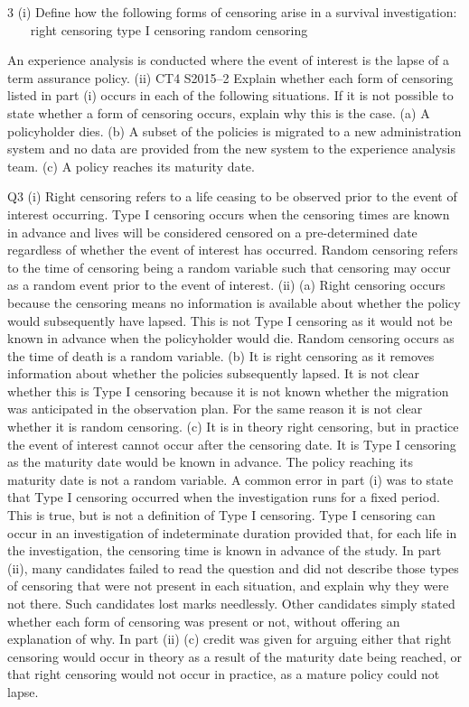 3 (i)
Define how the following forms of censoring arise in a survival investigation:



right censoring
type I censoring
random censoring

An experience analysis is conducted where the event of interest is the lapse of a term
assurance policy.
(ii)
CT4 S2015–2
Explain whether each form of censoring listed in part (i) occurs in each of the
following situations. If it is not possible to state whether a form of censoring
occurs, explain why this is the case.
(a) A policyholder dies.
(b) A subset of the policies is migrated to a new administration system and
no data are provided from the new system to the experience analysis
team.
(c) A policy reaches its maturity date.

Q3
(i)
Right censoring refers to a life ceasing to be observed prior to the event of
interest occurring.
Type I censoring occurs when the censoring times are known in advance and
lives will be considered censored on a pre-determined date regardless of
whether the event of interest has occurred.
Random censoring refers to the time of censoring being a random variable
such that censoring may occur as a random event prior to the event of interest.
(ii)
(a)
Right censoring occurs because the censoring means no information is
available about whether the policy would subsequently have lapsed.
This is not Type I censoring as it would not be known in advance when
the policyholder would die.
Random censoring occurs as the time of death is a random variable.
(b)
It is right censoring as it removes information about whether the
policies subsequently lapsed.
It is not clear whether this is Type I censoring because it is not known
whether the migration was anticipated in the observation plan.
For the same reason it is not clear whether it is random censoring.
(c)
It is in theory right censoring, but in practice the event of interest
cannot occur after the censoring date.
It is Type I censoring as the maturity date would be known in advance.
The policy reaching its maturity date is not a random variable.
A common error in part (i) was to state that Type I censoring occurred when
the investigation runs for a fixed period. This is true, but is not a definition of
Type I censoring. Type I censoring can occur in an investigation of
indeterminate duration provided that, for each life in the investigation, the
censoring time is known in advance of the study. In part (ii), many candidates
failed to read the question and did not describe those types of censoring that
were not present in each situation, and explain why they were not there.
Such candidates lost marks needlessly. Other candidates simply stated
whether each form of censoring was present or not, without offering an
explanation of why. In part (ii) (c) credit was given for arguing either that right
censoring would occur in theory as a result of the maturity date being
reached, or that right censoring would not occur in practice, as a mature
policy could not lapse.

